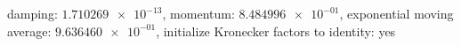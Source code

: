 damping: $\num[scientific-notation=true]{1.710269e-13}$, momentum: $\num[scientific-notation=true]{8.484996e-01}$, exponential moving average: $\num[scientific-notation=true]{9.636460e-01}$, initialize Kronecker factors to identity: yes